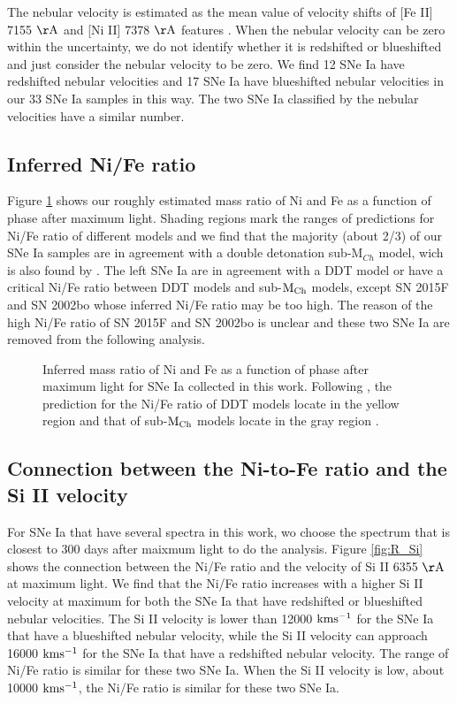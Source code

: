 \documentclass[twocolumn]{aastex631}
\begin{document}
The nebular velocity is estimated as the mean value of velocity shifts of [Fe II] 7155 $\rm \AA$ and [Ni II] 7378 $\rm \AA$ features \citep{2010Natur.466...82M}. When the nebular velocity can be zero within the uncertainty, we do not identify whether it is redshifted or blueshifted and just consider the nebular velocity to be zero. We find 12 SNe Ia have redshifted nebular velocities and 17 SNe Ia have blueshifted nebular velocities in our 33 SNe Ia samples in this way. The two SNe Ia classified by the nebular velocities have a similar number. 

\subsection{Inferred Ni/Fe ratio \label{subsec:ratio}}

Figure \ref{fig:r_p} shows our roughly estimated mass ratio of Ni and Fe as a function of phase after maximum light. Shading regions mark the ranges of predictions for Ni/Fe ratio of different models and we find that the majority (about 2/3) of our SNe Ia samples are in agreement with a double detonation sub-M$_{Ch}$ model, wich is also found by \citet{2020MNRAS.491.2902F}. The left SNe Ia are in agreement with a DDT model or have a critical Ni/Fe ratio between DDT models and sub-$\rm M_{Ch}$ models, except SN 2015F and SN 2002bo whose inferred Ni/Fe ratio may be too high. The reason of the high Ni/Fe ratio of SN 2015F and SN 2002bo is unclear and these two SNe Ia are removed from the following analysis.    

\begin{figure*}[ht!]
\caption{Inferred mass ratio of Ni and Fe as a function of phase after maximum light for SNe Ia collected in this work. Following \citet{2020MNRAS.491.2902F}, the prediction for the Ni/Fe ratio of DDT models locate in the yellow region \citep{2013MNRAS.429.1156S} and that of sub-$\rm M_{Ch}$ models locate in the gray region \citep{2018ApJ...854...52S}.} 
\label{fig:r_p}{}
\end{figure*}

\subsection{Connection between the Ni-to-Fe ratio and the Si II velocity \label{subsec:ratio_v}} 

For SNe Ia that have several spectra in this work, wo choose the spectrum that is closest to 300 days after maixmum light to do the analysis. Figure \ref{fig:R_Si} shows the connection between the Ni/Fe ratio and the velocity of Si II 6355 $\rm \AA$ at maximum light. We find that the Ni/Fe ratio increases with a higher Si II velocity at maximum for both the SNe Ia that have redshifted or blueshifted nebular velocities. The Si II velocity is lower than 12000 $\rm km s^{-1}$ for the SNe Ia that have a blueshifted nebular velocity, while the Si II velocity can approach 16000 $\rm km s^{-1}$ for the SNe Ia that have a redshifted nebular velocity. The range of Ni/Fe ratio is similar for these two SNe Ia. When the Si II velocity is low, about 10000 $\rm km s^{-1}$, the Ni/Fe ratio is similar for these two SNe Ia.   
\end{document}
